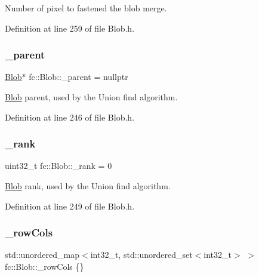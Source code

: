 Number of pixel to fastened the blob merge. 



Definition at line 259 of file Blob.\+h.

\mbox{\label{classfc_1_1Blob_ab58442d32a4ce2e9d5c4718d63e126d8}} 
\subsubsection{\texorpdfstring{\+\_\+parent}{\_parent}}
{\footnotesize\ttfamily \hyperlink{classfc_1_1Blob}{Blob}$\ast$ fc\+::\+Blob\+::\+\_\+parent = nullptr\hspace{0.3cm}{\ttfamily [private]}}



\hyperlink{classfc_1_1Blob}{Blob} parent, used by the Union find algorithm. 



Definition at line 246 of file Blob.\+h.

\mbox{\label{classfc_1_1Blob_ad19347abbefa18b6e98e1156cf09fe3a}} 
\subsubsection{\texorpdfstring{\+\_\+rank}{\_rank}}
{\footnotesize\ttfamily uint32\+\_\+t fc\+::\+Blob\+::\+\_\+rank = 0\hspace{0.3cm}{\ttfamily [private]}}



\hyperlink{classfc_1_1Blob}{Blob} rank, used by the Union find algorithm. 



Definition at line 249 of file Blob.\+h.

\mbox{\label{classfc_1_1Blob_a2688a4b64b2e3d37e7309aca03177b55}} 
\subsubsection{\texorpdfstring{\+\_\+row\+Cols}{\_rowCols}}
{\footnotesize\ttfamily std\+::unordered\+\_\+map$<$int32\+\_\+t, std\+::unordered\+\_\+set$<$int32\+\_\+t$>$ $>$ fc\+::\+Blob\+::\+\_\+row\+Cols \{\}\hspace{0.3cm}{\ttfamily [private]}}



